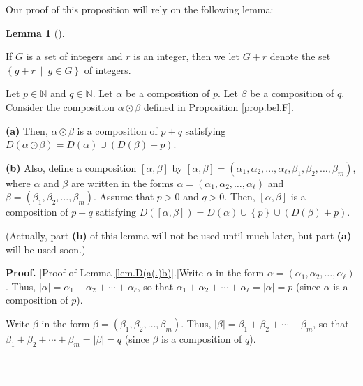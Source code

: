 \documentclass
[numbers=enddot,12pt,final,onecolumn,notitlepage,abstracton]{scrartcl}%
\theoremstyle{definition}
\newtheorem{lem}[theo]{Lemma}
\newenvironment{lemma}[1][]
{\begin{lem}[#1]\begin{leftbar}}
{\end{leftbar}\end{lem}}
\newenvironment{proof}[1][Proof]{\noindent\textbf{#1.} }{\ \rule{0.5em}{0.5em}}
\newenvironment{verlong}{}{}
\begin{document}
\begin{verlong}
Our proof of this proposition will rely on the following lemma:

\begin{lemma}
\label{lem.D(a(.)b)}If $G$ is a set of integers and $r$ is an integer, then we
let $G+r$ denote the set $\left\{  g+r\ \mid\ g\in G\right\}  $ of integers.

Let $p\in\mathbb{N}$ and $q\in\mathbb{N}$. Let $\alpha$ be a composition of
$p$. Let $\beta$ be a composition of $q$. Consider the composition
$\alpha\odot\beta$ defined in Proposition \ref{prop.bel.F}.

\textbf{(a)} Then, $\alpha\odot\beta$ is a composition of $p+q$ satisfying
$D\left(  \alpha\odot\beta\right)  =D\left(  \alpha\right)  \cup\left(
D\left(  \beta\right)  +p\right)  $.

\textbf{(b)} Also, define a composition $\left[  \alpha,\beta\right]  $ by
$\left[  \alpha,\beta\right]  =\left(  \alpha_{1},\alpha_{2},\ldots
,\alpha_{\ell},\beta_{1},\beta_{2},\ldots,\beta_{m}\right)  $, where $\alpha$
and $\beta$ are written in the forms $\alpha=\left(  \alpha_{1},\alpha
_{2},\ldots,\alpha_{\ell}\right)  $ and $\beta=\left(  \beta_{1},\beta
_{2},\ldots,\beta_{m}\right)  $. Assume that $p > 0$ and $q > 0$. Then,
$\left[  \alpha,\beta\right]  $ is a composition of $p+q$ satisfying $D\left(
\left[  \alpha,\beta\right]  \right)  =D\left(  \alpha\right)  \cup\left\{
p\right\}  \cup\left(  D\left(  \beta\right)  +p\right)  $.
\end{lemma}

(Actually, part \textbf{(b)} of this lemma will not be used until much later,
but part \textbf{(a)} will be used soon.)

\begin{proof}
[Proof of Lemma \ref{lem.D(a(.)b)}.]Write $\alpha$ in the form $\alpha=\left(
\alpha_{1},\alpha_{2},\ldots,\alpha_{\ell}\right)  $. Thus, $\left\vert
\alpha\right\vert =\alpha_{1}+\alpha_{2}+\cdots+\alpha_{\ell}$, so that
$\alpha_{1}+\alpha_{2}+\cdots+\alpha_{\ell}=\left\vert \alpha\right\vert =p$
(since $\alpha$ is a composition of $p$).

Write $\beta$ in the form $\beta=\left(  \beta_{1},\beta_{2},\ldots,\beta
_{m}\right)  $. Thus, $\left\vert \beta\right\vert =\beta_{1}+\beta_{2}%
+\cdots+\beta_{m}$, so that $\beta_{1}+\beta_{2}+\cdots+\beta_{m}=\left\vert
\beta\right\vert =q$ (since $\beta$ is a composition of $q$).


\end{proof}
\end{verlong}
\end{document}
